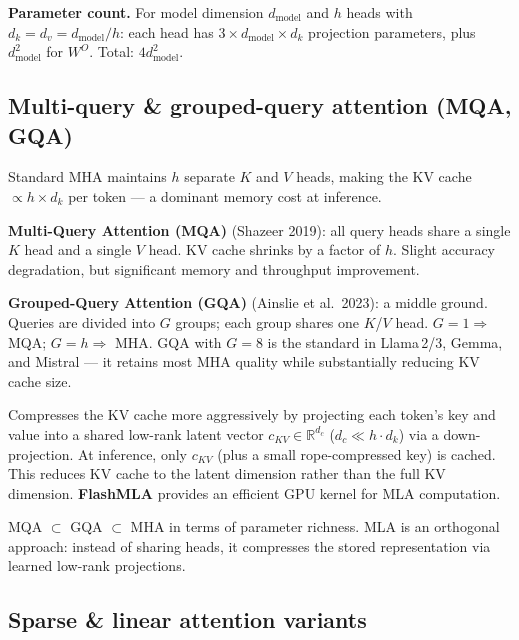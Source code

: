 \textbf{Parameter count.} For model dimension $d_\text{model}$ and $h$ heads with
$d_k = d_v = d_\text{model}/h$: each head has $3 \times d_\text{model} \times d_k$
projection parameters, plus $d_\text{model}^2$ for $W^O$. Total: $4 d_\text{model}^2$.

\subsection{Multi-query \& grouped-query attention (MQA, GQA)}

Standard MHA maintains $h$ separate $K$ and $V$ heads, making the KV cache
$\propto h \times d_k$ per token --- a dominant memory cost at inference.

\textbf{Multi-Query Attention (MQA)} (Shazeer 2019): all query heads share a single
$K$ head and a single $V$ head. KV cache shrinks by a factor of $h$. Slight accuracy
degradation, but significant memory and throughput improvement.

\textbf{Grouped-Query Attention (GQA)} (Ainslie et al.\ 2023): a middle ground.
Queries are divided into $G$ groups; each group shares one $K$/$V$ head.
$G=1 \Rightarrow$ MQA; $G=h \Rightarrow$ MHA. GQA with $G=8$ is the standard
in Llama\,2/3, Gemma, and Mistral --- it retains most MHA quality while substantially
reducing KV cache size.

\begin{paperbox}[title={Multi-head Latent Attention (MLA, DeepSeek-V2)}]
  Compresses the KV cache more aggressively by projecting each token's key and value
  into a shared low-rank latent vector $c_{KV} \in \mathbb{R}^{d_c}$ ($d_c \ll h \cdot d_k$)
  via a down-projection. At inference, only $c_{KV}$ (plus a small rope-compressed
  key) is cached. This reduces KV cache to the latent dimension rather than the full
  KV dimension. \textbf{FlashMLA} provides an efficient GPU kernel for MLA computation.
\end{paperbox}

\begin{notebox}
  MQA $\subset$ GQA $\subset$ MHA in terms of parameter richness.
  MLA is an orthogonal approach: instead of sharing heads, it compresses the stored
  representation via learned low-rank projections.
\end{notebox}

\subsection{Sparse \& linear attention variants}

